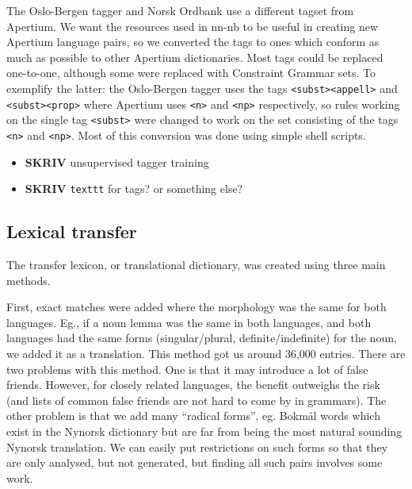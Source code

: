 \documentclass[11pt]{article}
\begin{document}
The Oslo-Bergen tagger and Norsk Ordbank use a different tagset from
Apertium. We want the resources used in nn-nb to be useful in creating
new Apertium language pairs, so we converted the tags to ones which
conform as much as possible to other Apertium dictionaries. Most tags
could be replaced one-to-one, although some were replaced with
Constraint Grammar sets. To exemplify the latter: the Oslo-Bergen
tagger uses the tags \texttt{<subst><appell>} and \texttt{<subst><prop>} where
Apertium uses \texttt{<n>} and \texttt{<np>} respectively, so rules working on the
single tag \texttt{<subst>} were changed to work on the set consisting of the
tags \texttt{<n>} and \texttt{<np>}. Most of this conversion was done using simple
shell scripts.
\begin{itemize}

\item \textbf{SKRIV} unsupervised tagger training\\
\label{sec-3.3.1}


\item \textbf{SKRIV} \texttt{texttt} for tags? or something else?\\
\label{sec-3.3.2}


\end{itemize} %
\subsection{Lexical transfer}
\label{sec-3.4}

The transfer lexicon, or translational dictionary, was created using
three main methods. 

First, exact matches were added where the morphology was the same for
both languages. Eg., if a noun lemma was the same in both languages,
and both languages had the same forms (singular/plural,
definite/indefinite) for the noun, we added it as a translation. This
method got us around 36,000 entries. There are two problems with this
method. One is that it may introduce a lot of false friends. However,
for closely related languages, the benefit outweighs the risk (and
lists of common false friends are not hard to come by in
grammars). The other problem is that we add many ``radical forms'',
eg. Bokmål words which exist in the Nynorsk dictionary but are far
from being the most natural sounding Nynorsk translation. We can
easily put restrictions on such forms so that they are only analysed,
but not generated, but finding all such pairs involves some work.
\end{document}
